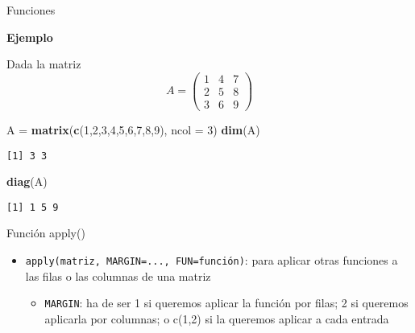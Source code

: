 \documentclass[
  ignorenonframetext,
]{beamer}
\newenvironment{Shaded}{\begin{snugshade}}{\end{snugshade}}
\newcommand{\DataTypeTok}[1]{\textcolor[rgb]{0.13,0.29,0.53}{#1}}
\newcommand{\DecValTok}[1]{\textcolor[rgb]{0.00,0.00,0.81}{#1}}
\newcommand{\KeywordTok}[1]{\textcolor[rgb]{0.13,0.29,0.53}{\textbf{#1}}}
\newcommand{\NormalTok}[1]{#1}
\newcommand{\StringTok}[1]{\textcolor[rgb]{0.31,0.60,0.02}{#1}}
\providecommand{\tightlist}{%
  \setlength{\itemsep}{0pt}\setlength{\parskip}{0pt}}
\begin{document}
\begin{frame}[fragile]{Funciones}
\protect\hypertarget{funciones-6}{}

\textbf{Ejemplo}

Dada la matriz \[A = \begin{pmatrix}
1 & 4 & 7\\
2 & 5 & 8\\
3 & 6 & 9
\end{pmatrix}\]

\begin{Shaded}
\begin{Highlighting}[]
\NormalTok{A =}\StringTok{ }\KeywordTok{matrix}\NormalTok{(}\KeywordTok{c}\NormalTok{(}\DecValTok{1}\NormalTok{,}\DecValTok{2}\NormalTok{,}\DecValTok{3}\NormalTok{,}\DecValTok{4}\NormalTok{,}\DecValTok{5}\NormalTok{,}\DecValTok{6}\NormalTok{,}\DecValTok{7}\NormalTok{,}\DecValTok{8}\NormalTok{,}\DecValTok{9}\NormalTok{), }\DataTypeTok{ncol =} \DecValTok{3}\NormalTok{)}
\KeywordTok{dim}\NormalTok{(A)}
\end{Highlighting}
\end{Shaded}

\begin{verbatim}
[1] 3 3
\end{verbatim}

\begin{Shaded}
\begin{Highlighting}[]
\KeywordTok{diag}\NormalTok{(A)}
\end{Highlighting}
\end{Shaded}

\begin{verbatim}
[1] 1 5 9
\end{verbatim}

\end{frame}

\begin{frame}[fragile]{Función apply()}
\protect\hypertarget{funciuxf3n-apply}{}

\begin{itemize}
\tightlist
\item
  \texttt{apply(matriz,\ MARGIN=...,\ FUN=función)}: para aplicar otras
  funciones a las filas o las columnas de una matriz

  \begin{itemize}
  \tightlist
  \item
    \texttt{MARGIN}: ha de ser 1 si queremos aplicar la función por
    filas; 2 si queremos aplicarla por columnas; o c(1,2) si la queremos
    aplicar a cada entrada
  \end{itemize}
\end{itemize}

\end{frame}
\end{document}
